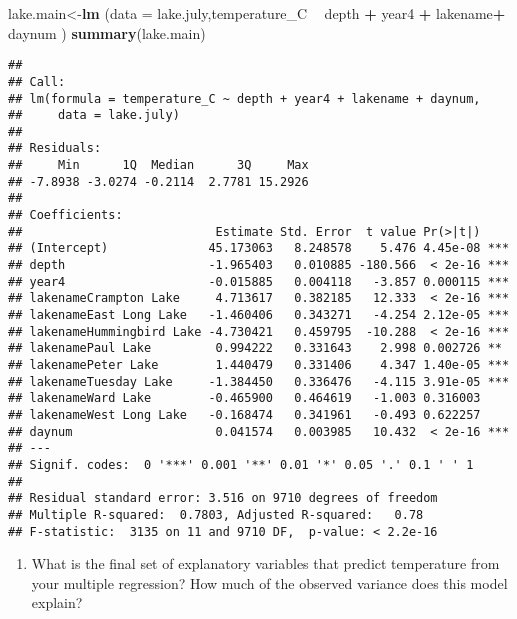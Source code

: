 \documentclass[]{article}
\newenvironment{Shaded}{\begin{snugshade}}{\end{snugshade}}
\newcommand{\DataTypeTok}[1]{\textcolor[rgb]{0.13,0.29,0.53}{#1}}
\newcommand{\KeywordTok}[1]{\textcolor[rgb]{0.13,0.29,0.53}{\textbf{#1}}}
\newcommand{\NormalTok}[1]{#1}
\newcommand{\OperatorTok}[1]{\textcolor[rgb]{0.81,0.36,0.00}{\textbf{#1}}}
\newcommand{\StringTok}[1]{\textcolor[rgb]{0.31,0.60,0.02}{#1}}
\providecommand{\tightlist}{%
  \setlength{\itemsep}{0pt}\setlength{\parskip}{0pt}}
\begin{document}
\begin{Shaded}
\begin{Highlighting}[]
\NormalTok{lake.main<-}\KeywordTok{lm}\NormalTok{ (}\DataTypeTok{data =}\NormalTok{ lake.july,temperature_C }\OperatorTok{~}\StringTok{ }\NormalTok{depth }\OperatorTok{+}\StringTok{ }\NormalTok{year4 }\OperatorTok{+}\StringTok{ }\NormalTok{lakename}\OperatorTok{+}\StringTok{ }\NormalTok{daynum )}
\KeywordTok{summary}\NormalTok{(lake.main)}
\end{Highlighting}
\end{Shaded}

\begin{verbatim}
## 
## Call:
## lm(formula = temperature_C ~ depth + year4 + lakename + daynum, 
##     data = lake.july)
## 
## Residuals:
##     Min      1Q  Median      3Q     Max 
## -7.8938 -3.0274 -0.2114  2.7781 15.2926 
## 
## Coefficients:
##                           Estimate Std. Error  t value Pr(>|t|)    
## (Intercept)              45.173063   8.248578    5.476 4.45e-08 ***
## depth                    -1.965403   0.010885 -180.566  < 2e-16 ***
## year4                    -0.015885   0.004118   -3.857 0.000115 ***
## lakenameCrampton Lake     4.713617   0.382185   12.333  < 2e-16 ***
## lakenameEast Long Lake   -1.460406   0.343271   -4.254 2.12e-05 ***
## lakenameHummingbird Lake -4.730421   0.459795  -10.288  < 2e-16 ***
## lakenamePaul Lake         0.994222   0.331643    2.998 0.002726 ** 
## lakenamePeter Lake        1.440479   0.331406    4.347 1.40e-05 ***
## lakenameTuesday Lake     -1.384450   0.336476   -4.115 3.91e-05 ***
## lakenameWard Lake        -0.465900   0.464619   -1.003 0.316003    
## lakenameWest Long Lake   -0.168474   0.341961   -0.493 0.622257    
## daynum                    0.041574   0.003985   10.432  < 2e-16 ***
## ---
## Signif. codes:  0 '***' 0.001 '**' 0.01 '*' 0.05 '.' 0.1 ' ' 1
## 
## Residual standard error: 3.516 on 9710 degrees of freedom
## Multiple R-squared:  0.7803, Adjusted R-squared:   0.78 
## F-statistic:  3135 on 11 and 9710 DF,  p-value: < 2.2e-16
\end{verbatim}

\begin{enumerate}
\def\labelenumi{\arabic{enumi}.}
\setcounter{enumi}{4}
\tightlist
\item
  What is the final set of explanatory variables that predict
  temperature from your multiple regression? How much of the observed
  variance does this model explain?
\end{enumerate}
\end{document}
